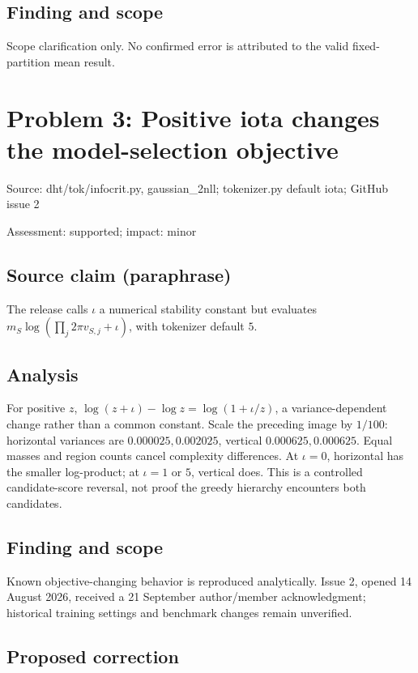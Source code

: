 \documentclass[11pt]{article}
\begin{document}
\subsection*{Finding and scope}

Scope clarification only. No confirmed error is attributed to the valid fixed-partition mean result.

\section*{Problem 3: Positive iota changes the model-selection objective}

Source: dht/tok/infocrit.py, gaussian\_2nll; tokenizer.py default iota; GitHub issue 2

Assessment: supported; impact: minor

\subsection*{Source claim (paraphrase)}

The release calls \(\iota\) a numerical stability constant but evaluates \(m_S\log(\prod_j2\pi v_{S,j}+\iota)\), with tokenizer default \(5\).

\subsection*{Analysis}

For positive \(z\), \(\log(z+\iota)-\log z=\log(1+\iota/z)\), a variance-dependent change rather than a common constant. Scale the preceding image by \(1/100\): horizontal variances are \(0.000025,0.002025\), vertical \(0.000625,0.000625\). Equal masses and region counts cancel complexity differences. At \(\iota=0\), horizontal has the smaller log-product; at \(\iota=1\) or \(5\), vertical does. This is a controlled candidate-score reversal, not proof the greedy hierarchy encounters both candidates.

\subsection*{Finding and scope}

Known objective-changing behavior is reproduced analytically. Issue 2, opened 14 August 2026, received a 21 September author/member acknowledgment; historical training settings and benchmark changes remain unverified.

\subsection*{Proposed correction}
\end{document}
